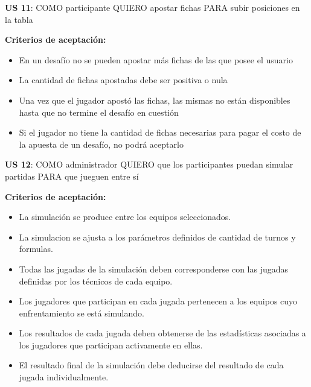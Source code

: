 \begin{tcolorbox}
\textbf{US 11}: COMO participante QUIERO apostar fichas PARA subir posiciones en la tabla

\vline

\textbf{Criterios de aceptación:}
\begin{itemize}
\item En un desafío no se pueden apostar más fichas de las que posee el usuario
\item La cantidad de fichas apostadas debe ser positiva o nula
\item Una vez que el jugador apostó las fichas, las mismas no están disponibles hasta que no termine el desafío en cuestión
\item Si el jugador no tiene la cantidad de fichas necesarias para pagar el costo de la apuesta de un desafío, no podrá aceptarlo
\end{itemize}
\end{tcolorbox}
\vspace{10pt}


\begin{tcolorbox}
\textbf{US 12}: COMO administrador QUIERO que los participantes puedan simular partidas PARA que jueguen entre sí

\vline

\textbf{Criterios de aceptación:}
\begin{itemize}
\item La simulación se produce entre los equipos seleccionados.
\item La simulacion se ajusta a los parámetros definidos de cantidad de turnos y formulas.
\item Todas las jugadas de la simulación deben corresponderse con las jugadas definidas por los técnicos de cada equipo.
\item Los jugadores que participan en cada jugada pertenecen a los equipos cuyo enfrentamiento se está simulando.
\item Los resultados de cada jugada deben obtenerse de las estadísticas asociadas a los jugadores que participan activamente en ellas.
\item El resultado final de la simulación debe deducirse del resultado de cada jugada individualmente.
\end{itemize}
\end{tcolorbox}
\vspace{10pt}


